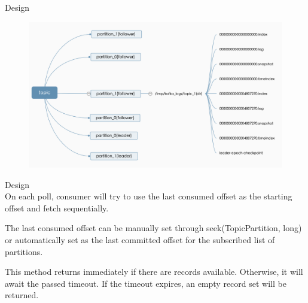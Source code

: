 \begin{frame}[plain,t]{Design} %
     \\
    \vspace{2ex}
     \begin{figure}
        \centering
        \includegraphics[width=0.9\linewidth]{image/0220}
        \label{fig:0220}
    \end{figure}
    
    
\end{frame}
\begin{frame}[plain,t]{Design} %
     \\
    \vspace{2ex}
    On each poll, consumer will try to use the last consumed offset as the starting offset and fetch sequentially. 
    
     \vspace{2ex}
    The last consumed offset can be manually set through seek(TopicPartition, long) or automatically set as the last committed offset for the subscribed list of partitions.
    
     \vspace{2ex}
    This method returns immediately if there are records available. Otherwise, it will await the passed timeout. If the timeout expires, an empty record set will be returned.
    
\end{frame}


